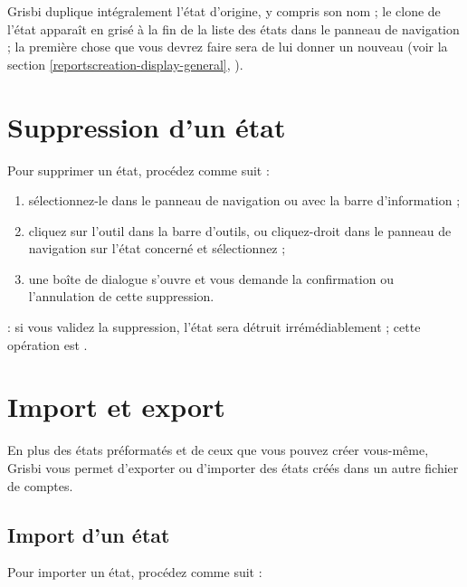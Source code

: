 Grisbi duplique intégralement l'état d'origine, y compris son nom ; le clone de l'état apparaît en grisé à la fin de  la liste des états dans le panneau de navigation ; la première chose que vous devrez faire sera de lui donner un nouveau  (voir la section \vref{reportscreation-display-general}, ). 


\section{Suppression d'un état\label{reports-delete}}


Pour supprimer un état, procédez comme suit :

\begin{enumerate}
	 \item sélectionnez-le dans le panneau de navigation ou avec la barre d'information ;
	 \item cliquez sur l'outil  dans la barre d'outils, ou cliquez-droit dans le panneau de navigation sur l'état concerné et sélectionnez  ;
	 \item une  boîte de dialogue s'ouvre et vous demande la confirmation ou l'annulation de cette suppression.
\end{enumerate}

 : si vous validez la suppression, l'état sera détruit irrémédiablement ; cette opération est .


\section{Import et export\label{reports-importexport} }


En plus des états préformatés et de ceux que vous pouvez créer vous-même, Grisbi vous permet d'exporter ou d'importer des états créés dans un autre fichier de comptes.



\subsection{Import d'un état\label{reports-importexport-import} }

Pour importer un état, procédez comme suit :

